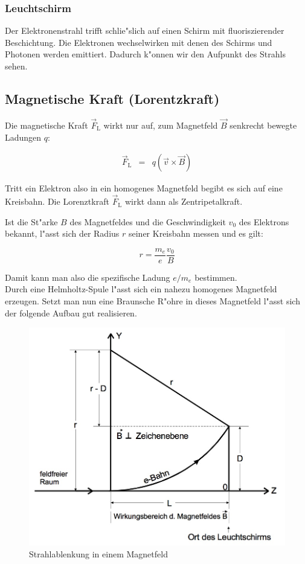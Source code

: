 		\subsubsection{Leuchtschirm}

			Der Elektronenstrahl trifft schlie"slich auf einen Schirm mit fluoriszierender Beschichtung.
			Die Elektronen wechselwirken mit denen des Schirms und Photonen werden emittiert. Dadurch k"onnen wir den Aufpunkt des Strahls sehen.

	\subsection{Magnetische Kraft (Lorentzkraft)}

		Die magnetische Kraft $\vec{F}_\mathrm{L}$ wirkt nur auf, zum Magnetfeld $\vec{B}$ senkrecht bewegte La\-dun\-gen $q$:

		\begin{eqnarray}
			\vec{F}_\mathrm{L} & = & q \left( \vec{v} \times \vec{B} \right)
		\end{eqnarray}

		Tritt ein Elektron also in ein homogenes Magnetfeld begibt es sich auf eine Kreisbahn.
		Die Lorenztkraft $\vec{F}_\mathrm{L}$ wirkt dann als Zentripetalkraft.

		Ist die St"arke $B$ des Magnetfeldes und die Geschwindigkeit $v_0$ des Elektrons bekannt, l"asst sich der Radius $r$ seiner Kreisbahn messen und es gilt:

		\begin{equation}
			r = \frac{m_e}{e} \frac{v_0}{B}
		\end{equation}
	
		Damit kann man also die spezifische Ladung $e / m_e$ bestimmen.\\

		Durch eine Helmholtz-Spule l"asst sich ein nahezu homogenes Magnetfeld erzeugen.
		Setzt man nun eine Braunsche R"ohre in dieses Magnetfeld l"asst sich der folgende Aufbau gut realisieren.

		\begin{figure}[h]
			\centering
			\includegraphics[width = 12cm]{img/magnetfeld.jpg}
			\caption{Strahlablenkung in einem Magnetfeld}
			\label{magnetfeld}
		\end{figure}

